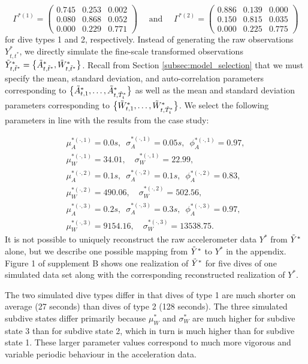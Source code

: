 \[\Gamma^{*(1)} = \begin{pmatrix} 0.745 & 0.253 & 0.002 \\ 0.080 & 0.868 & 0.052 \\ 0.000 & 0.229 & 0.771 \end{pmatrix} \quad \text{ and } \quad \Gamma^{*(2)} = \begin{pmatrix} 0.886 & 0.139 & 0.000 \\ 0.150 & 0.815 & 0.035 \\ 0.000 & 0.225 & 0.775 \end{pmatrix}\]
%
for dive types 1 and 2, respectively.
Instead of generating the raw observations $Y^*_{t,t^*}$, we directly simulate the fine-scale transformed observations $\tilde{Y}^*_{t,\tilde t^*} = \big\{\tilde{A}^*_{t,\tilde t^*}, \tilde{W}^*_{t,\tilde t^*}\big\}$. Recall from Section \ref{subsec:model_selection} that we must specify the mean, standard deviation, and auto-correlation parameters corresponding to $\big\{\tilde{A}^*_{t,1},\ldots,\tilde{A}^*_{t,\tilde T_t^*}\big\}$ as well as the mean and standard deviation parameters corresponding to $\big\{\tilde{W}^*_{t,1},\ldots,\tilde{W}^*_{t,\tilde T_t^*}\big\}$. We select the following parameters in line with the results from the case study:

\begin{gather*}
    \mu_A^{*(\cdot,1)} = 0.0 s, \enspace \sigma_A^{*(\cdot,1)} = 0.05s, \enspace \phi_A^{*(\cdot,1)} = 0.97, \\
    \mu_W^{*(\cdot,1)} = 34.01, \quad \sigma_W^{*(\cdot,1)} = 22.99, \\
    \mu_A^{*(\cdot,2)} = 0.1 s, \enspace \sigma_A^{*(\cdot,2)} = 0.1s, \enspace \phi_A^{*(\cdot,2)} = 0.83, \\
    \mu_W^{*(\cdot,2)} = 490.06, \quad \sigma_W^{*(\cdot,2)} = 502.56, \\
    \mu_A^{*(\cdot,3)} = 0.2 s, \enspace \sigma_A^{*(\cdot,3)} = 0.3 s, \enspace \phi_A^{*(\cdot,3)} = 0.97, \\
    \mu_W^{*(\cdot,3)} = 9154.16, \quad \sigma_W^{*(\cdot,3)} = 13538.75.
\end{gather*}
%
It is not possible to uniquely reconstruct the raw accelerometer data $Y^*$ from $\tilde{Y}^*$ alone, but we describe one possible mapping from $\tilde{Y}^*$ to $Y^*$ in the appendix. Figure 1 of supplement B shows one realization of $\tilde{Y}^*$ for five dives of one simulated data set along with the corresponding reconstructed realization of $Y^*$. 

The two simulated dive types differ in that dives of type 1 are much shorter on average (27 seconds) than dives of type 2 (128 seconds). The three simulated subdive states differ primarily because $\mu_W^*$ and $\sigma_W^*$ are much higher for subdive state 3 than for subdive state 2, which in turn is much higher than for subdive state 1. These larger parameter values correspond to much more vigorous and variable periodic behaviour in the acceleration data. 

